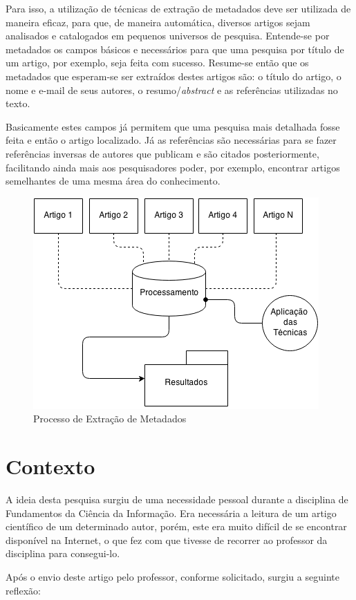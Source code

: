 Para isso, a utilização de técnicas de extração de metadados deve ser utilizada de maneira eficaz, para que, de maneira automática, diversos artigos sejam analisados e catalogados em pequenos universos de pesquisa. Entende-se por metadados os campos básicos e necessários para que uma pesquisa por título de um artigo, por exemplo, seja feita com sucesso. Resume-se então que os metadados que esperam-se ser extraídos destes artigos são: o título do artigo, o nome e e-mail de seus autores, o resumo/\textit{abstract} e as referências utilizadas no texto.

Basicamente estes campos já permitem que uma pesquisa mais detalhada fosse feita e então o artigo localizado. Já as referências são necessárias para se fazer referências inversas de autores que publicam e são citados posteriormente, facilitando ainda mais aos pesquisadores poder, por exemplo, encontrar artigos semelhantes de uma mesma área do conhecimento.

\begin{figure}
\centering
\caption{Processo de Extração de Metadados}
\label{fig:introducao}
\includegraphics[width=0.7\linewidth]{./assets/introducao}
\end{figure}

\section{Contexto}

A ideia desta pesquisa surgiu de uma necessidade pessoal durante a disciplina de Fundamentos da Ciência da Informação. Era necessária a leitura de um artigo científico de um determinado autor, porém, este era muito difícil de se encontrar disponível na Internet, o que fez com que tivesse de recorrer ao professor da disciplina para consegui-lo.

Após o envio deste artigo pelo professor, conforme solicitado, surgiu a seguinte reflexão:

